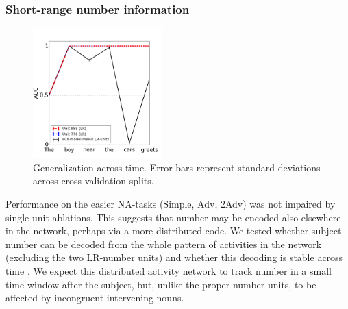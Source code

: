 \subsubsection{Short-range number information}
\begin{figure}
    \centering
    \includegraphics[height=5cm]{Figures/GAT1d_cell_.png}
    \caption{Generalization across time. Error bars represent standard deviations across cross-validation splits.}
    \label{fig:GAT}
\end{figure}

Performance on the easier NA-tasks (Simple, Adv, 2Adv) was not
impaired by single-unit ablations. This suggests that number may be
encoded also elsewhere in the network, perhaps via a more distributed
code. We tested whether subject number can be decoded from the whole
pattern of activities in the network (excluding the two LR-number units)
and whether this decoding is stable across time \cite[see][for similar
observations and related methods]{Giulianelli:etal:2018}. We expect
this distributed activity network to track number in a
small time window after the subject, but, unlike the proper number units,
to be affected by incongruent intervening nouns.

